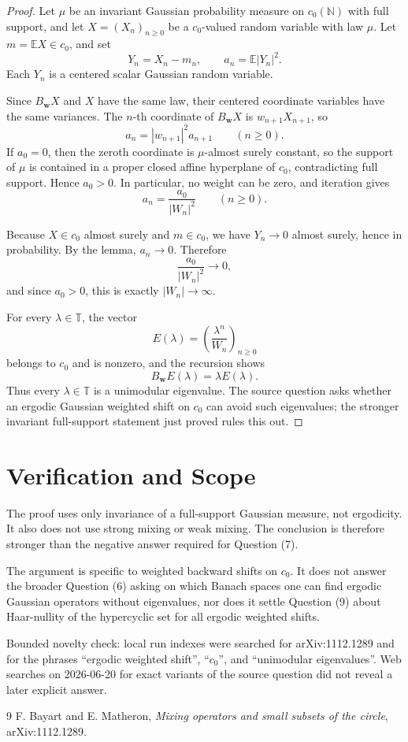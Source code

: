 \documentclass[11pt]{article}
\newcommand{\TT}{\mathbb T}
\newcommand{\NN}{\mathbb N}
\newcommand{\EE}{\mathbb E}
\begin{document}
\begin{proof}
Let \(\mu\) be an invariant Gaussian probability measure on \(c_0(\NN)\) with
full support, and let \(X=(X_n)_{n\ge0}\) be a \(c_0\)-valued random variable
with law \(\mu\).  Let \(m=\EE X\in c_0\), and set
\[
  Y_n=X_n-m_n,\qquad a_n=\EE |Y_n|^2.
\]
Each \(Y_n\) is a centered scalar Gaussian random variable.

Since \(B_{\mathbf w}X\) and \(X\) have the same law, their centered coordinate
variables have the same variances.  The \(n\)-th coordinate of \(B_{\mathbf w}X\)
is \(w_{n+1}X_{n+1}\), so
\[
  a_n=|w_{n+1}|^2 a_{n+1}\qquad(n\ge0).
\]
If \(a_0=0\), then the zeroth coordinate is \(\mu\)-almost surely constant, so
the support of \(\mu\) is contained in a proper closed affine hyperplane of
\(c_0\), contradicting full support. Hence \(a_0>0\). In particular, no weight
can be zero, and iteration gives
\[
  a_n=\frac{a_0}{|W_n|^2}\qquad(n\ge0).
\]

Because \(X\in c_0\) almost surely and \(m\in c_0\), we have \(Y_n\to0\) almost
surely, hence in probability. By the lemma, \(a_n\to0\). Therefore
\[
  \frac{a_0}{|W_n|^2}\longrightarrow0,
\]
and since \(a_0>0\), this is exactly \(|W_n|\to\infty\).

For every \(\lambda\in\TT\), the vector
\[
  E(\lambda)=\left(\frac{\lambda^n}{W_n}\right)_{n\ge0}
\]
belongs to \(c_0\) and is nonzero, and the recursion shows
\[
  B_{\mathbf w}E(\lambda)=\lambda E(\lambda).
\]
Thus every \(\lambda\in\TT\) is a unimodular eigenvalue. The source question
asks whether an ergodic Gaussian weighted shift on \(c_0\) can avoid such
eigenvalues; the stronger invariant full-support statement just proved rules
this out.
\end{proof}

\section*{Verification and Scope}

The proof uses only invariance of a full-support Gaussian measure, not
ergodicity. It also does not use strong mixing or weak mixing. The conclusion is
therefore stronger than the negative answer required for Question (7).

The argument is specific to weighted backward shifts on \(c_0\). It does not
answer the broader Question (6) asking on which Banach spaces one can find
ergodic Gaussian operators without eigenvalues, nor does it settle Question (9)
about Haar-nullity of the hypercyclic set for all ergodic weighted shifts.

Bounded novelty check: local run indexes were searched for arXiv:1112.1289 and
for the phrases ``ergodic weighted shift'', ``\(c_0\)'', and ``unimodular
eigenvalues''. Web searches on 2026-06-20 for exact variants of the source
question did not reveal a later explicit answer.

\begin{thebibliography}{9}
F. Bayart and E. Matheron,
\emph{Mixing operators and small subsets of the circle},
arXiv:1112.1289.
\end{thebibliography}
\end{document}
